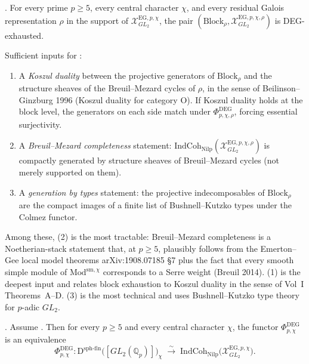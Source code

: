 \begin{conjecture}
\label{v4-arith:deg-f1a:conj:block-exhaustion}
\ClaimStatusConjectured. For every prime \(p\geq 5\), every
central character \(\chi\), and every residual Galois representation
\(\rho\) in the support of \(\mathcal{X}^{\mathrm{EG},p,\chi}_{GL_{2}}\),
the pair
\((\mathrm{Block}_{\rho},\mathcal{X}^{\mathrm{EG},p,\chi,\rho}_{GL_{2}})\)
is DEG-exhausted.
\end{conjecture}

\begin{remark}
\label{v4-arith:deg-f1a:rem:how-to-prove-block-exhaustion}
Sufficient inputs for
:
\begin{enumerate}
\item A \emph{Koszul duality} between the projective generators of
\(\mathrm{Block}_{\rho}\) and the structure sheaves of the
Breuil--Mezard cycles of \(\rho\), in the sense of Beilinson--Ginzburg
1996 (Koszul duality for category O). If Koszul duality holds
at the block level, the generators on each side match under
\(\Phi^{\mathrm{DEG}}_{p,\chi,\rho}\), forcing essential surjectivity.
\item A \emph{Breuil--Mezard completeness} statement:
\(\mathrm{IndCoh}_{\mathrm{Nilp}}(\mathcal{X}^{\mathrm{EG},p,\chi,\rho}_{GL_{2}})\)
is compactly generated by structure sheaves of Breuil--Mezard cycles
(not merely supported on them).
\item A \emph{generation by types} statement: the projective
indecomposables of \(\mathrm{Block}_{\rho}\) are the compact images
of a finite list of Bushnell--Kutzko types under the Colmez functor.
\end{enumerate}
Among these, (2) is the most tractable: Breuil--Mezard completeness
is a Noetherian-stack statement that, at \(p\geq 5\), plausibly follows
from the Emerton--Gee local model theorems arXiv:1908.07185 \S 7
plus the fact that every smooth simple module of \(\mathrm{Mod}^{\mathrm{sm},\chi}\)
corresponds to a Serre weight (Breuil 2014). (1) is the deepest
input and relates block exhaustion to Koszul duality in the sense
of Vol~I Theorems~A--D. (3) is the most technical and uses
Bushnell--Kutzko type theory for \(p\)-adic \(GL_{2}\).
\end{remark}

\begin{theorem}
\label{v4-arith:deg-f1a:thm:ess-surj-conditional}
\ClaimStatusProvedHereConditional. Assume
. Then for every
\(p\geq 5\) and every central character \(\chi\), the functor
\(\Phi^{\mathrm{DEG}}_{p,\chi}\) is an equivalence
\begin{equation}
\label{v4-arith:deg-f1a:eq:ess-surj-conditional}
\Phi^{\mathrm{DEG}}_{p,\chi}\colon\mathrm{D}^{\mathrm{sph\text{-}fin}}\bigl([GL_{2}(\mathbb{Q}_{p})]\bigr)_{\chi}
\;\xrightarrow{\;\sim\;}\;\mathrm{IndCoh}_{\mathrm{Nilp}}\bigl(\mathcal{X}^{\mathrm{EG},p,\chi}_{GL_{2}}\bigr).
\end{equation}
\end{theorem}

